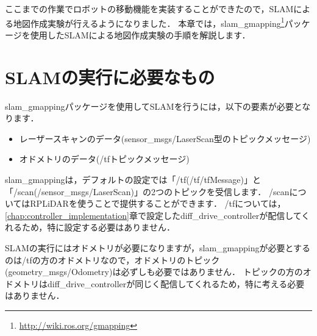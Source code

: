 \documentclass[{../../master}]{subfiles}
\begin{document}
ここまでの作業でロボットの移動機能を実装することができたので，SLAMによる地図作成実験が行えるようになりました．
本章では，\textsf{slam\_gmapping}\footnote{\url{http://wiki.ros.org/gmapping}}パッケージを使用したSLAMによる地図作成実験の手順を解説します．

\section{SLAMの実行に必要なもの}
\label{sec:required_things_for_slam}

\textsf{slam\_gmapping}パッケージを使用してSLAMを行うには，以下の要素が必要となります．

\begin{itemize}
  \item レーザースキャンのデータ(\textsf{sensor\_msgs/LaserScan}型のトピックメッセージ)
  \item オドメトリのデータ(\textsf{/tf}トピックメッセージ)
\end{itemize}

\textsf{slam\_gmapping}は，デフォルトの設定では「\textsf{/tf}(\textsf{/tf/tfMessage})」と「\textsf{/scan}(\textsf{/sensor\_msgs/LaserScan})」の2つのトピックを受信します．
\textsf{/scan}についてはRPLiDARを使うことで提供することができます．
\textsf{/tf}については，\ref{chap:controller_implementation}章で設定した\textsf{diff\_drive\_controller}が配信してくれるため，特に設定する必要はありません．

SLAMの実行にはオドメトリが必要になりますが，\textsf{slam\_gmapping}が必要とするのは\textsf{/tf}の方のオドメトリなので，オドメトリのトピック(\textsf{geometry\_msgs/Odometry})は必ずしも必要ではありません．
トピックの方のオドメトリは\textsf{diff\_drive\_controller}が同じく配信してくれるため，特に考える必要はありません．
\end{document}
